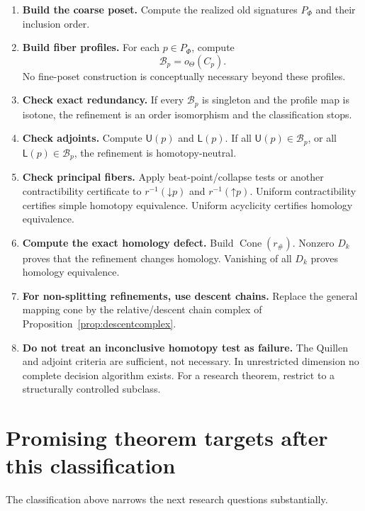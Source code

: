 \documentclass[11pt]{article}
\theoremstyle{definition}
\newcommand{\Cone}{\operatorname{Cone}}
\newcommand{\down}{\mathord\downarrow}
\newcommand{\up}{\mathord\uparrow}
\begin{document}
\begin{enumerate}[label=\textbf{Step \arabic*.},leftmargin=4em]
\item \textbf{Build the coarse poset.} Compute the realized old signatures \(P_\Phi\) and their inclusion order.
\item \textbf{Build fiber profiles.} For each \(p\in P_\Phi\), compute
\[
\mathcal B_p=o_\Theta(C_p).
\]
No fine-poset construction is conceptually necessary beyond these profiles.
\item \textbf{Check exact redundancy.} If every \(\mathcal B_p\) is singleton and the profile map is isotone, the refinement is an order isomorphism and the classification stops.
\item \textbf{Check adjoints.} Compute \(\mathsf U(p)\) and \(\mathsf L(p)\). If all \(\mathsf U(p)\in\mathcal B_p\), or all \(\mathsf L(p)\in\mathcal B_p\), the refinement is homotopy-neutral.
\item \textbf{Check principal fibers.} Apply beat-point/collapse tests or another contractibility certificate to \(r^{-1}(\down p)\) and \(r^{-1}(\up p)\). Uniform contractibility certifies simple homotopy equivalence. Uniform acyclicity certifies homology equivalence.
\item \textbf{Compute the exact homology defect.} Build \(\Cone(r_\#)\). Nonzero \(D_k\) proves that the refinement changes homology. Vanishing of all \(D_k\) proves homology equivalence.
\item \textbf{For non-splitting refinements, use descent chains.} Replace the general mapping cone by the relative/descent chain complex of Proposition~\ref{prop:descentcomplex}.
\item \textbf{Do not treat an inconclusive homotopy test as failure.} The Quillen and adjoint criteria are sufficient, not necessary. In unrestricted dimension no complete decision algorithm exists. For a research theorem, restrict to a structurally controlled subclass.
\end{enumerate}

\section{Promising theorem targets after this classification}

The classification above narrows the next research questions substantially.
\end{document}
